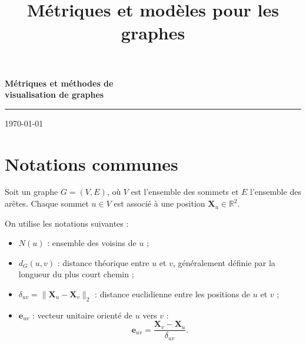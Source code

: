 \documentclass[a4paper,11pt]{article}
\title{Métriques et modèles pour les graphes}
\author{}
\date{}
\begin{document}

\begin{titlepage}
    \centering
    \vspace*{5cm} %

    {\Huge\bfseries Métriques et méthodes de\\[0.3cm] visualisation de graphes\par}
    
    \vspace{0.5cm}
    \rule{0.5\textwidth}{1pt} %

    \vfill

    {\large \today\par}
\end{titlepage}


\tableofcontents
\thispagestyle{empty}
\newpage

\section{Notations communes}

Soit un graphe $G=(V,E)$, où $V$ est l'ensemble des
sommets et $E$ l'ensemble des arêtes. Chaque sommet
$u\in V$ est associé à une position
$\mathbf{X}_u\in\mathbb{R}^2$.

On utilise les notations suivantes :

\begin{itemize}
    \item $N(u)$ : ensemble des voisins de $u$ ;
    \item $d_G(u,v)$ : distance théorique entre $u$ et $v$,
    généralement définie par la longueur du plus court chemin ;
    \item $\delta_{uv}=\|\mathbf{X}_u-\mathbf{X}_v\|_2$ :
    distance euclidienne entre les positions de $u$ et $v$ ;
    \item $\mathbf{e}_{uv}$ : vecteur unitaire orienté de
    $u$ vers $v$ :
    \[
    \mathbf{e}_{uv}
    =
    \frac{\mathbf{X}_v-\mathbf{X}_u}{\delta_{uv}}.
    \]
\end{itemize}
\end{document}
